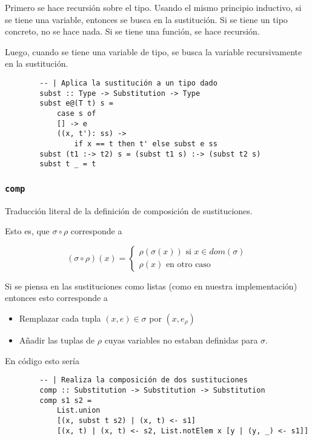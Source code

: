 \documentclass{article}
\begin{document}
    Primero se hace recursión sobre el tipo.
    Usando el mismo principio inductivo, si se tiene una variable, entonces se
    busca en la sustitución.
    Si se tiene un tipo concreto, no se hace nada.
    Si se tiene una función, se hace recursión.

    Luego, cuando se tiene una variable de tipo, se busca la variable
    recursivamente en la sustitución.

    \begin{verbatim}
        -- | Aplica la sustitución a un tipo dado
        subst :: Type -> Substitution -> Type
        subst e@(T t) s = 
            case s of
            [] -> e
            ((x, t'): ss) -> 
                if x == t then t' else subst e ss
        subst (t1 :-> t2) s = (subst t1 s) :-> (subst t2 s)
        subst t _ = t
    \end{verbatim}

    \subsubsection{\texttt{comp}}

    Traducción literal de la definición de composición de sustituciones.

    Esto es, que $\sigma \circ \rho$ corresponde a
    
    \[
        (\sigma \circ \rho)(x) = 
        \begin{cases}
            \rho (\sigma (x)) \text{ si }  x \in dom(\sigma) \\
            \rho (x) \text{ en otro caso }
        \end{cases}
    \]

    Si se piensa en las sustituciones como listas (como en nuestra
    implementación) entonces esto corresponde a

    \begin{itemize}
        \item Remplazar cada tupla $(x, e) \in \sigma$ por $(x, e_{\rho})$
        \item Añadir las tuplas de $\rho$ cuyas variables no estaban definidas
        para $\sigma$.
    \end{itemize}

    En código esto sería

    \begin{verbatim}
        -- | Realiza la composición de dos sustituciones
        comp :: Substitution -> Substitution -> Substitution
        comp s1 s2 = 
            List.union
            [(x, subst t s2) | (x, t) <- s1] 
            [(x, t) | (x, t) <- s2, List.notElem x [y | (y, _) <- s1]]
    \end{verbatim}
\end{document}

